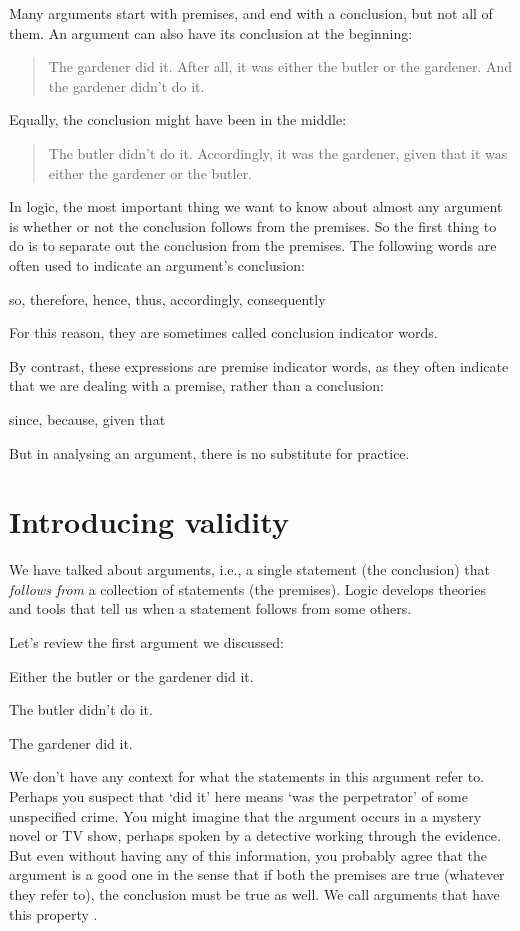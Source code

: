 \documentclass[PHIL101-Textbook.tex]{subfiles}
\begin{document}
Many arguments start with premises, and end with a conclusion, but not all of them. An argument can also have its conclusion at the beginning:
	\begin{quote}
		The gardener did it. After all, it was either the butler or the
		gardener. And the gardener didn't do it. 
	\end{quote}
Equally, the conclusion might have been in the middle:
	\begin{quote}
		The butler didn't do it. Accordingly, it was the gardener,
		given that it was either the gardener or the butler.
	\end{quote}
In logic, the most important thing we want to know about almost any argument is whether or not the conclusion follows from the premises. So the first thing to do is to separate out the conclusion from the premises. The following words are often used to indicate an argument's conclusion:
	\begin{center}
		so, therefore, hence, thus, accordingly, consequently
	\end{center}
For this reason, they are sometimes called conclusion
indicator words.

By contrast, these expressions are premise indicator words,
as they often indicate that we are dealing with a premise, rather than a
conclusion:
	\begin{center}
		since, because, given that
	\end{center}
But in analysing an argument, there is no substitute for practice.


\section{Introducing validity}

We have talked about arguments, i.e., a single statement (the conclusion) that \emph{follows from} a collection of statements (the premises). Logic develops theories and tools that tell us when a statement follows from some others.

Let's review the first argument we discussed:
\begin{earg}
	\item[] Either the butler or the gardener did it.
	\item[] The butler didn't do it.
	\item[\therefore] The gardener did it.
\end{earg}
We don't have any context for what the statements in this argument refer to. Perhaps you suspect that `did it' here means `was the perpetrator' of some unspecified crime. You might imagine that the argument occurs in a mystery novel or TV show, perhaps spoken by a detective working through the evidence. But even without having any of this information, you probably agree that the argument is a good one in the sense that if both the premises are true (whatever they refer to), the conclusion must be true as well. We call arguments that have this property .
\end{document}
